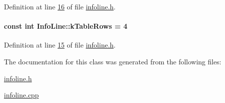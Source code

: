Definition at line \hyperlink{infoline_8h_source_l00016}{16} of file \hyperlink{infoline_8h_source}{infoline.\+h}.

\hypertarget{class_info_line_a95cdc7a95cde6db7c6faceda995d26b9}{}
\paragraph[{k\+Table\+Rows}]{\setlength{\rightskip}{0pt plus 5cm}const int Info\+Line\+::k\+Table\+Rows = 4\hspace{0.3cm}{\ttfamily [static]}}\label{class_info_line_a95cdc7a95cde6db7c6faceda995d26b9}


Definition at line \hyperlink{infoline_8h_source_l00015}{15} of file \hyperlink{infoline_8h_source}{infoline.\+h}.



The documentation for this class was generated from the following files\+:\begin{DoxyCompactItemize}
\item 
\hyperlink{infoline_8h}{infoline.\+h}\item 
\hyperlink{infoline_8cpp}{infoline.\+cpp}\end{DoxyCompactItemize}

